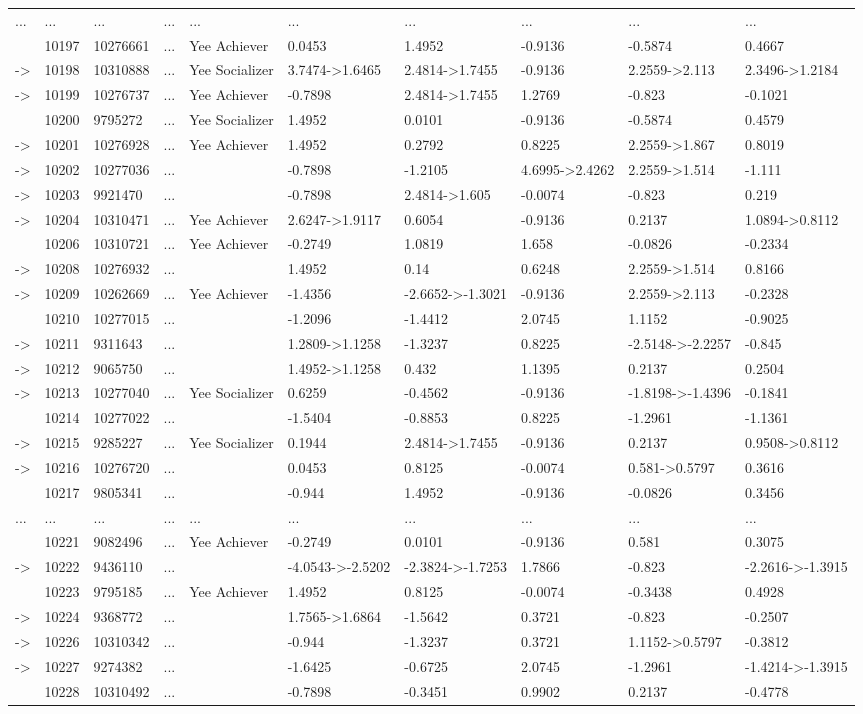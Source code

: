 \documentclass[6pt,a4paper]{article}
\begin{document}
{\begin{longtable}{llllllllll}
...&...&...&...&...&...&...&...&...&...\tabularnewline
&10197&10276661&...&Yee Achiever&0.0453&1.4952&-0.9136&-0.5874&0.4667\tabularnewline
-\textgreater &10198&10310888&...&Yee Socializer&3.7474-\textgreater 1.6465&2.4814-\textgreater 1.7455&-0.9136&2.2559-\textgreater 2.113&2.3496-\textgreater 1.2184\tabularnewline
-\textgreater &10199&10276737&...&Yee Achiever&-0.7898&2.4814-\textgreater 1.7455&1.2769&-0.823&-0.1021\tabularnewline
&10200&9795272&...&Yee Socializer&1.4952&0.0101&-0.9136&-0.5874&0.4579\tabularnewline
-\textgreater &10201&10276928&...&Yee Achiever&1.4952&0.2792&0.8225&2.2559-\textgreater 1.867&0.8019\tabularnewline
-\textgreater &10202&10277036&...&&-0.7898&-1.2105&4.6995-\textgreater 2.4262&2.2559-\textgreater 1.514&-1.111\tabularnewline
-\textgreater &10203&9921470&...&&-0.7898&2.4814-\textgreater 1.605&-0.0074&-0.823&0.219\tabularnewline
-\textgreater &10204&10310471&...&Yee Achiever&2.6247-\textgreater 1.9117&0.6054&-0.9136&0.2137&1.0894-\textgreater 0.8112\tabularnewline
&10206&10310721&...&Yee Achiever&-0.2749&1.0819&1.658&-0.0826&-0.2334\tabularnewline
-\textgreater &10208&10276932&...&&1.4952&0.14&0.6248&2.2559-\textgreater 1.514&0.8166\tabularnewline
-\textgreater &10209&10262669&...&Yee Achiever&-1.4356&-2.6652-\textgreater -1.3021&-0.9136&2.2559-\textgreater 2.113&-0.2328\tabularnewline
&10210&10277015&...&&-1.2096&-1.4412&2.0745&1.1152&-0.9025\tabularnewline
-\textgreater &10211&9311643&...&&1.2809-\textgreater 1.1258&-1.3237&0.8225&-2.5148-\textgreater -2.2257&-0.845\tabularnewline
-\textgreater &10212&9065750&...&&1.4952-\textgreater 1.1258&0.432&1.1395&0.2137&0.2504\tabularnewline
-\textgreater &10213&10277040&...&Yee Socializer&0.6259&-0.4562&-0.9136&-1.8198-\textgreater -1.4396&-0.1841\tabularnewline
&10214&10277022&...&&-1.5404&-0.8853&0.8225&-1.2961&-1.1361\tabularnewline
-\textgreater &10215&9285227&...&Yee Socializer&0.1944&2.4814-\textgreater 1.7455&-0.9136&0.2137&0.9508-\textgreater 0.8112\tabularnewline
-\textgreater &10216&10276720&...&&0.0453&0.8125&-0.0074&0.581-\textgreater 0.5797&0.3616\tabularnewline
&10217&9805341&...&&-0.944&1.4952&-0.9136&-0.0826&0.3456\tabularnewline
...&...&...&...&...&...&...&...&...&...\tabularnewline
&10221&9082496&...&Yee Achiever&-0.2749&0.0101&-0.9136&0.581&0.3075\tabularnewline
-\textgreater &10222&9436110&...&&-4.0543-\textgreater -2.5202&-2.3824-\textgreater -1.7253&1.7866&-0.823&-2.2616-\textgreater -1.3915\tabularnewline
&10223&9795185&...&Yee Achiever&1.4952&0.8125&-0.0074&-0.3438&0.4928\tabularnewline
-\textgreater &10224&9368772&...&&1.7565-\textgreater 1.6864&-1.5642&0.3721&-0.823&-0.2507\tabularnewline
-\textgreater &10226&10310342&...&&-0.944&-1.3237&0.3721&1.1152-\textgreater 0.5797&-0.3812\tabularnewline
-\textgreater &10227&9274382&...&&-1.6425&-0.6725&2.0745&-1.2961&-1.4214-\textgreater -1.3915\tabularnewline
&10228&10310492&...&&-0.7898&-0.3451&0.9902&0.2137&-0.4778\tabularnewline


\end{longtable}}
\end{document}
